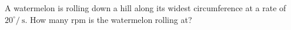 A watermelon is rolling down a hill along its widest circumference at a rate of $20^{\circ} /\ \text{s}$. How many rpm is the watermelon rolling at?
